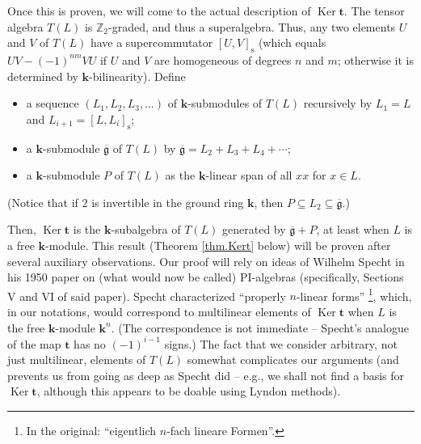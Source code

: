 \documentclass[numbers=enddot,12pt,final,onecolumn,notitlepage]{scrartcl}%
\theoremstyle{definition}
\begin{document}
Once this is proven, we will come to the actual description of
$\operatorname*{Ker}\mathbf{t}$. The tensor algebra $T\left(  L\right)  $ is
$\mathbb{Z}_{2}$-graded, and thus a superalgebra. Thus, any two elements $U$
and $V$ of $T\left(  L\right)  $ have a supercommutator $\left[  U,V\right]
_{\operatorname*{s}}$ (which equals $UV-\left(  -1\right)  ^{nm}VU$ if $U$ and
$V$ are homogeneous of degrees $n$ and $m$; otherwise it is determined by
$\mathbf{k}$-bilinearity). Define

\begin{itemize}
\item a sequence $\left(  L_{1},L_{2},L_{3},\ldots\right)  $ of $\mathbf{k}%
$-submodules of $T\left(  L\right)  $ recursively by $L_{1}=L$ and
$L_{i+1}=\left[  L,L_{i}\right]  _{\operatorname*{s}}$;

\item a $\mathbf{k}$-submodule $\overline{\mathfrak{g}}$ of $T\left(
L\right)  $ by $\overline{\mathfrak{g}}=L_{2}+L_{3}+L_{4}+\cdots$;

\item a $\mathbf{k}$-submodule $P$ of $T\left(  L\right)  $ as the
$\mathbf{k}$-linear span of all $xx$ for $x\in L$.
\end{itemize}

(Notice that if $2$ is invertible in the ground ring $\mathbf{k}$, then
$P\subseteq L_{2}\subseteq\overline{\mathfrak{g}}$.)

Then, $\operatorname*{Ker}\mathbf{t}$ is the $\mathbf{k}$-subalgebra of
$T\left(  L\right)  $ generated by $\overline{\mathfrak{g}}+P$, at least when
$L$ is a free $\mathbf{k}$-module. This result (Theorem \ref{thm.Kert} below)
will be proven after several auxiliary observations. Our proof will rely on
ideas of Wilhelm Specht in his 1950 paper \cite{specht} on (what would now be
called) PI-algebras (specifically, Sections V and VI of said paper). Specht
characterized \textquotedblleft properly $n$-linear forms\textquotedblright%
\footnote{In the original: \textquotedblleft eigentlich $n$-fach lineare
Formen\textquotedblright.}, which, in our notations, would correspond to
multilinear elements of $\operatorname*{Ker}\mathbf{t}$ when $L$ is the free
$\mathbf{k}$-module $\mathbf{k}^{n}$. (The correspondence is not immediate --
Specht's analogue of the map $\mathbf{t}$ has no $\left(  -1\right)  ^{i-1}$
signs.) The fact that we consider arbitrary, not just multilinear, elements of
$T\left(  L\right)  $ somewhat complicates our arguments (and prevents us from
going as deep as Specht did -- e.g., we shall not find a basis for
$\operatorname*{Ker}\mathbf{t}$, although this appears to be doable using
Lyndon methods).
\end{document}
